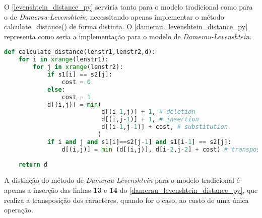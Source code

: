 O \autoref{levenshtein_distance_py} serviria tanto para o modelo tradicional como para o de \textit{Damerau-Levenshtein}, necessitando apenas implementar o método {\code calculate\_distance()} de forma distinta. O \autoref{damerau_levenshtein_distance_py} representa como seria a implementação para o modelo de \textit{Damerau-Levenshtein}.

\begin{lstlisting}[language=Python,label=damerau_levenshtein_distance_py,caption={Implementação da distância de Damerau-Levenshtein}]
def calculate_distance(lenstr1,lenstr2,d):
    for i in xrange(lenstr1):
        for j in xrange(lenstr2):
            if s1[i] == s2[j]:
                cost = 0
            else:
                cost = 1
            d[(i,j)] = min(
                           d[(i-1,j)] + 1, # deletion
                           d[(i,j-1)] + 1, # insertion
                           d[(i-1,j-1)] + cost, # substitution
                          )
            if i and j and s1[i]==s2[j-1] and s1[i-1] == s2[j]:
                d[(i,j)] = min (d[(i,j)], d[i-2,j-2] + cost) # transposition
 
    return d
\end{lstlisting}

A distinção do método de \textit{Damerau-Levenshtein} para o modelo tradicional é apenas a inserção das linhas \textbf{13} e \textbf{14} do \autoref{damerau_levenshtein_distance_py}, que realiza a transposição dos caracteres, quando for o caso, ao custo de uma única operação.

